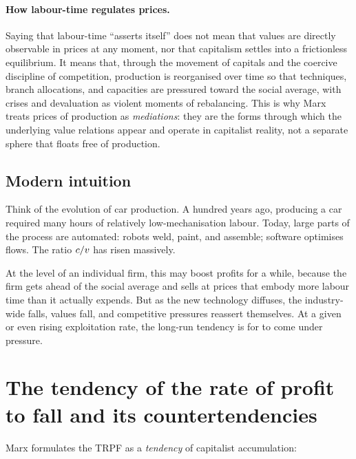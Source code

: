 \begin{example}
\paragraph{How labour-time regulates prices.}
Saying that labour-time ``asserts itself'' does not mean that values are directly observable in prices at any moment, nor that capitalism settles into a frictionless equilibrium.
It means that, through the movement of capitals and the coercive discipline of competition, production is reorganised over time so that
techniques, branch allocations, and capacities are pressured toward the social average, with crises and devaluation as violent moments of rebalancing.
This is why Marx treats prices of production as \emph{mediations}: they are the forms through which the underlying value relations
appear and operate in capitalist reality, not a separate sphere that floats free of production.
\end{example}

\subsection{Modern intuition}

Think of the evolution of car production. A hundred years ago, producing a
car required many hours of relatively low-mechanisation labour. Today, large
parts of the process are automated: robots weld, paint, and assemble; software
optimises flows. The ratio $c/v$ has risen massively.

At the level of an individual firm, this may boost profits for a while,
because the firm gets ahead of the social average and sells at prices that
embody more labour time than it actually expends. But as the new technology
diffuses, the industry-wide \snlt{} falls, values fall, and competitive
pressures reassert themselves. At a given or even rising exploitation rate,
the long-run tendency is for \profitrate{} to come under pressure.

\section{The tendency of the rate of profit to fall and its countertendencies}
\label{sec:trpf}

Marx formulates the TRPF as a \emph{tendency} of capitalist accumulation:\cite{Marx1894,Roberts2016}

